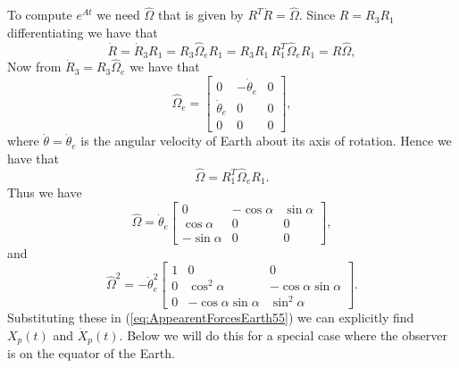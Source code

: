 \documentclass[graybox,envcountchap,sectrefs]{svmonoMuga}
\begin{document}
To compute $e^{At}$ we need $\widehat{\Omega}$ that is given by $R^T\dot{R}=\widehat{\Omega}$. Since $R=R_3R_1$ differentiating we have that
\[
\dot{R}=\dot{R}_3R_1=R_3\widehat{\Omega}_eR_1=R_3R_1\, R_1^T\widehat{\Omega}_eR_1=R\widehat{\Omega},
\]
Now from $\dot{R}_3=R_3\widehat{\Omega}_e$  we have that
\[
\widehat{\Omega}_e= \left[
\begin{array}{ccc}
0  & -\dot{\theta}_e & 0\\
\dot{\theta}_e & 0 & 0\\
0 & 0 & 0
\end{array}
\right],
\]
where $\dot{\theta}=\dot{\theta}_e$ is the angular velocity of Earth about its axis of rotation.
Hence we have  that
\[
\widehat{\Omega}=R_1^T\widehat{\Omega}_eR_1.
\]
 Thus we have
\[
\widehat{\Omega}=\dot{\theta}_e \left[
\begin{array}{ccc}
0 & -\cos{\alpha} & \sin{\alpha} \\
\cos{\alpha} & 0 & 0\\
-\sin{\alpha} & 0 & 0
\end{array}
\right],
\]
and
\[
\widehat{\Omega}^2= -\dot{\theta}^2_e\left[
\begin{array}{ccc}
1 & 0 & 0\\
0 & \cos^2{\alpha} & -\cos{\alpha}\sin{\alpha} \\
0 & -\cos{\alpha}\sin{\alpha}  & \sin^2{\alpha}
\end{array}
\right].
\]
Substituting these in (\ref{eq:AppearentForcesEarth55}) we can explicitly find $X_p(t)$ and 
$\dot{X}_p(t)$. Below we will do this for a special case where the observer is on the equator of the Earth.
\end{document}
